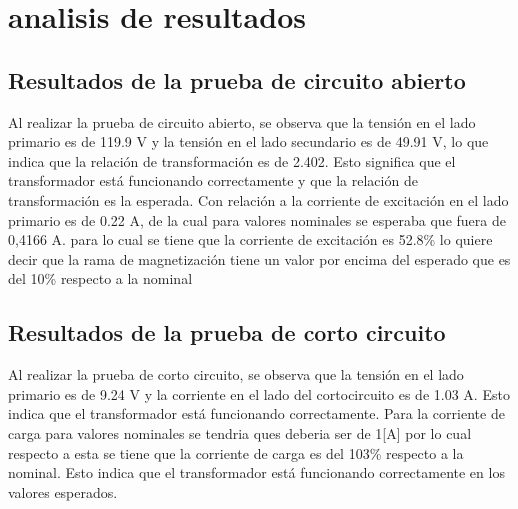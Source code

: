 \section{analisis de resultados}
\subsection{Resultados de la prueba de circuito abierto}
Al realizar la prueba de circuito abierto, se observa que la tensión en el lado primario es de 119.9 V y la tensión en el lado secundario es de 49.91 V, lo que indica que la relación de transformación es de 2.402. Esto significa que el transformador está funcionando correctamente y que la relación de transformación es la esperada.
Con relación a la corriente de excitación en el lado primario es de 0.22 A, de la cual para valores nominales se esperaba que fuera de 0,4166 A. para lo cual se tiene que la corriente de excitación es 52.8\% lo quiere decir que la rama de magnetización tiene un valor por encima del esperado que es del 10\% respecto a la nominal%

\subsection{Resultados de la prueba de corto circuito}
Al realizar la prueba de corto circuito, se observa que la tensión en el lado primario es de 9.24 V y la corriente en el lado del cortocircuito es de 1.03 A. Esto indica que el transformador está funcionando correctamente. Para la corriente de carga para valores nominales se tendria ques deberia ser de 1[A] por lo cual respecto a esta se tiene que la corriente de carga es del 103\% respecto a la nominal. Esto indica que el transformador está funcionando correctamente en los valores esperados.


